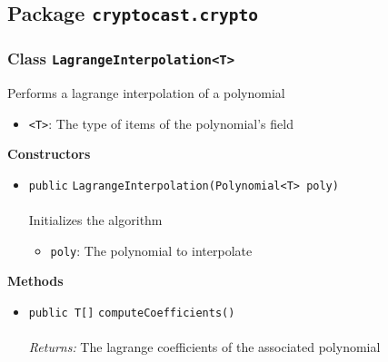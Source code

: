 \subsection{Package \lstinline!cryptocast.crypto!}

\subsubsection{Class \lstinline|LagrangeInterpolation<T>|}
Performs a lagrange interpolation of a polynomial \\
\noindent\begin{minipage}[t]{5cm}
\vspace{0.3em}
\hspace*{2em}
\vspace{0.3em}
\end{minipage}

\begin{itemize}
\item \lstinline|<T>|: The type of items of the polynomial's field
\end{itemize}



\textbf{\sffamily Constructors}
\begin{itemize}
\item \lstinline|public| \lstinline|LagrangeInterpolation|\lstinline|(Polynomial<T> poly)|\\ \\[-0.6em]
Initializes the algorithm
\begin{itemize}
\item \lstinline|poly|: The polynomial to interpolate
\end{itemize}



\end{itemize}


\textbf{\sffamily Methods}
\begin{itemize}
\item \lstinline|public T[]| \lstinline|computeCoefficients|\lstinline|()|\\ \\[-0.6em]
\emph{Returns:} The lagrange coefficients of the associated polynomial



\end{itemize}

